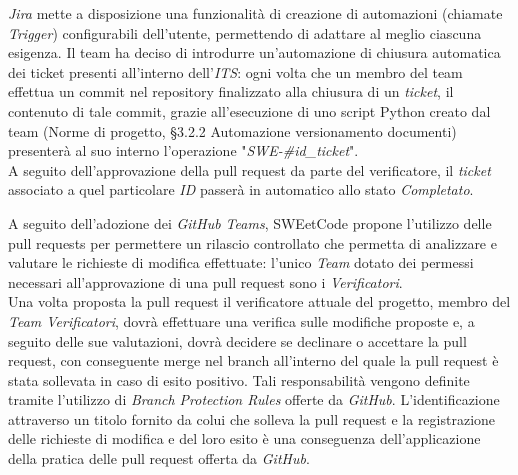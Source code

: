 \documentclass[10pt, a4paper]{article}
\begin{document}
 \textit{Jira} mette a disposizione una funzionalità di creazione di automazioni (chiamate \textit{Trigger}) configurabili dell'utente, permettendo di adattare al meglio ciascuna esigenza.
Il team ha deciso di introdurre un'automazione di chiusura automatica dei ticket presenti all'interno dell'\textit{ITS}: ogni volta che un membro del team 
effettua un commit nel repository finalizzato alla chiusura di un \textit{ticket}, il contenuto di tale commit, grazie all'esecuzione di uno script Python creato dal team (Norme di progetto, \S 3.2.2 Automazione versionamento documenti)
presenterà al suo interno l'operazione "\textit{SWE-\#id\_ticket}".\\
A seguito dell'approvazione della pull request da parte del verificatore, il \textit{ticket} associato a quel particolare \textit{ID} passerà in automatico
allo stato \textit{Completato}.

\label{sec:pull_request}
A seguito dell'adozione dei \textit{GitHub Teams}, SWEetCode propone l'utilizzo delle pull requests per permettere un rilascio controllato che permetta di analizzare 
e valutare le richieste di modifica effettuate: l'unico \textit{Team} dotato dei permessi necessari all'approvazione di una pull request sono i \textit{Verificatori}.\\
Una volta proposta la pull request il verificatore attuale del progetto, membro del \textit{Team Verificatori}, dovrà effettuare una verifica sulle modifiche proposte e,
a seguito delle sue valutazioni, dovrà decidere se declinare o accettare la pull request, con conseguente merge nel branch all'interno del quale la pull request è stata 
sollevata in caso di esito positivo.
Tali responsabilità vengono definite tramite l'utilizzo di \textit{Branch Protection Rules} offerte da \textit{GitHub}.
L'identificazione attraverso un titolo fornito da colui che solleva la pull request e la registrazione delle richieste di modifica e del loro esito è una conseguenza
dell'applicazione della pratica delle pull request offerta da \textit{GitHub}.
\end{document}
